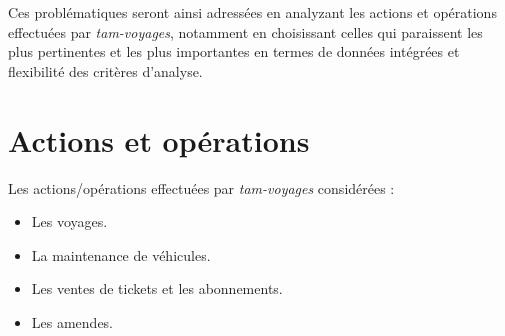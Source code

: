 \documentclass[a4paper,12pt]{report}
\begin{document}
Ces problématiques seront ainsi adressées en analyzant les actions et opérations effectuées par \textit{tam-voyages}, notamment en choisissant celles qui paraissent les plus pertinentes et les plus importantes en termes de données intégrées et flexibilité des critères d'analyse.

\section{Actions et opérations}
Les actions/opérations effectuées par \textit{tam-voyages} considérées :
\begin{itemize}
  \item Les voyages.
  \item La maintenance de véhicules.
  \item Les ventes de tickets et les abonnements.
  \item Les amendes.
\end{itemize}
\end{document}
